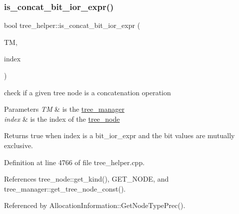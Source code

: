 \subsubsection{\texorpdfstring{is\+\_\+concat\+\_\+bit\+\_\+ior\+\_\+expr()}{is\_concat\_bit\_ior\_expr()}}
{\footnotesize\ttfamily bool tree\+\_\+helper\+::is\+\_\+concat\+\_\+bit\+\_\+ior\+\_\+expr (\begin{DoxyParamCaption}\item[{const \hyperlink{tree__manager_8hpp_a792e3f1f892d7d997a8d8a4a12e39346}{tree\+\_\+manager\+Const\+Ref} \&}]{TM,  }\item[{const unsigned int}]{index }\end{DoxyParamCaption})\hspace{0.3cm}{\ttfamily [static]}}



check if a given tree node is a concatenation operation 


\begin{DoxyParams}{Parameters}
{\em TM} & is the \hyperlink{classtree__manager}{tree\+\_\+manager} \\
\hline
{\em index} & is the index of the \hyperlink{classtree__node}{tree\+\_\+node} \\
\hline
\end{DoxyParams}
\begin{DoxyReturn}{Returns}
true when index is a bit\+\_\+ior\+\_\+expr and the bit values are mutually exclusive. 
\end{DoxyReturn}


Definition at line 4766 of file tree\+\_\+helper.\+cpp.



References tree\+\_\+node\+::get\+\_\+kind(), G\+E\+T\+\_\+\+N\+O\+DE, and tree\+\_\+manager\+::get\+\_\+tree\+\_\+node\+\_\+const().



Referenced by Allocation\+Information\+::\+Get\+Node\+Type\+Prec().


